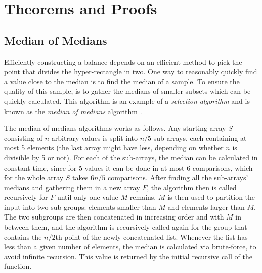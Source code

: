 \appendix
\chapter{Theorems and Proofs}
\label{chap:append}


\section{Median of Medians}
\label{ann:median}
Efficiently constructing a balance \kdtree depends on an efficient method to pick the point that divides the hyper-rectangle in two. One way to reasonably quickly find a value close to the median is to find the median of a sample. To ensure the quality of this sample, is to gather the medians of smaller subsets which can be quickly calculated. This algorithm is an example of a \emph{selection algorithm} and is known as the \emph{median of medians} algorithm \cite{selection}.

The median of medians algorithms works as follows. Any starting array $S$ consisting of $n$ arbitrary values is split into $n/5$ sub-arrays, each containing at most 5 elements (the last array might have less, depending on whether $n$ is divisible by 5 or not). For each of the sub-arrays, the median can be calculated in constant time, since for 5 values it can be done in at most 6 comparisons, which for the whole array $S$ takes $6n/5$ comparisons. After finding all the sub-arrays' medians and gathering them in a new array $F$, the algorithm then is called recursively for $F$ until only one value $M$ remains. $M$ is then used to partition the input into two sub-groups: elements smaller than $M$ and elements larger than $M$. The two subgroups are then concatenated in increasing order and with $M$ in between them, and the algorithm is recursively called again for the group that contains the $n/2$th point of the newly concatenated list. Whenever the list has less than a given number of elements, the median is calculated via brute-force, to avoid infinite recursion. This value is returned by the initial recursive call of the function.

